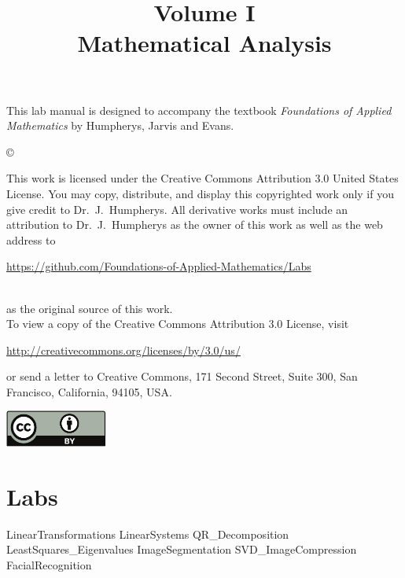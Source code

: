 \documentclass[opener-c,labs,blue,nociteref]{HJnewsiambook}
\title{Volume I\\ Mathematical Analysis}
\begin{document}

\thispagestyle{empty} %
\maketitle
\thispagestyle{empty}
\frontmatter



\begin{thepreface} %

This lab manual is designed to accompany the textbook \emph{Foundations of Applied Mathematics} by Humpherys, Jarvis and Evans.

\vfill
\copyright{This work is licensed under the Creative Commons Attribution 3.0 United States
License.  You may copy, distribute, and display this copyrighted work only if you give
credit to Dr.~J.~Humpherys. All derivative works must include an attribution to Dr.~J.~Humpherys as the owner of this work as well as the web address to
\\\centerline{\url{https://github.com/Foundations-of-Applied-Mathematics/Labs}}\\as the original source of this work.
\\To view a copy of the Creative Commons Attribution 3.0 License, visit
\\\centerline{\url{http://creativecommons.org/licenses/by/3.0/us/}} or send a letter to Creative Commons, 171 Second Street, Suite 300, San Francisco, California, 94105, USA.}

\vfill
\centering\includegraphics[height=1.2cm]{by.pdf}
\vfill
\end{thepreface}

\setcounter{tocdepth}{1}
\tableofcontents

\mainmatter %

\part{Labs} %
{LinearTransformations}
{LinearSystems}
{QR_Decomposition}
{LeastSquares_Eigenvalues}
{ImageSegmentation}
{SVD_ImageCompression}
{FacialRecognition}
\end{document}
